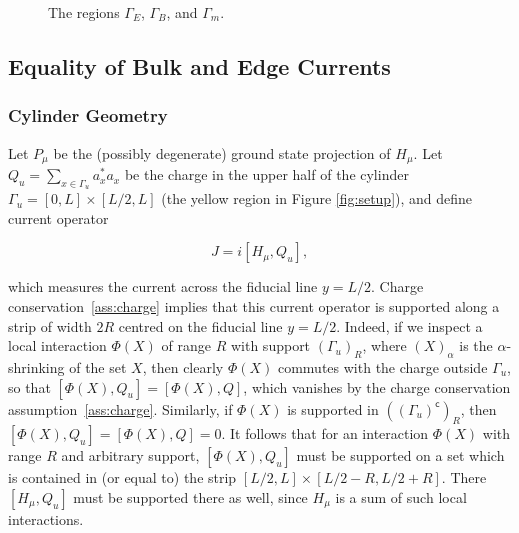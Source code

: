 \documentclass[12pt, letterpaper]{article}
\begin{document}
\begin{figure}[h!]
\caption{The regions $\Gamma_E$, $\Gamma_B$, and $\Gamma_m$.}
\label{fig:regions}
\end{figure}




\subsection{Equality of Bulk and Edge Currents}

\subsubsection{Cylinder Geometry}

Let $P_\mu$ be the (possibly degenerate) ground state projection of $H_\mu$. Let $Q_u = \sum_{x \in \Gamma_u} a_x^* a_x$ be the charge in the upper half of the cylinder $\Gamma_u = [0,L] \times [L/2,L]$ (the yellow region in Figure \ref{fig:setup}), and define current operator 

\[J = i[H_\mu,Q_u],\]

which measures the current across the fiducial line $y=L/2$. Charge conservation~\ref{ass:charge} implies that this current operator is supported along a strip of width $2R$ centred on the fiducial line $y=L/2$. Indeed, if we inspect a local interaction $\Phi(X)$ of range $R$ with support $(\Gamma_u)_R$, where $(X)_\alpha$ is the $\alpha$-shrinking of the set $X$, then clearly $\Phi(X)$ commutes with the charge outside $\Gamma_u$, so that $[\Phi(X), Q_u] = [\Phi(X), Q]$, which vanishes by the charge conservation assumption~\ref{ass:charge}. Similarly, if $\Phi(X)$ is supported in $((\Gamma_u)^\mathsf{c})_R$, then $[\Phi(X), Q_u] = [\Phi(X), Q] = 0$. It follows that for an interaction $\Phi(X)$ with range $R$ and arbitrary support, $[\Phi(X), Q_u]$ must be supported on a set which is contained in (or equal to) the strip $[L/2, L] \times [L/2-R, L/2+R]$. There $[H_\mu,Q_u]$ must be supported there as well, since $H_\mu$ is a sum of such local interactions. 
\end{document}
